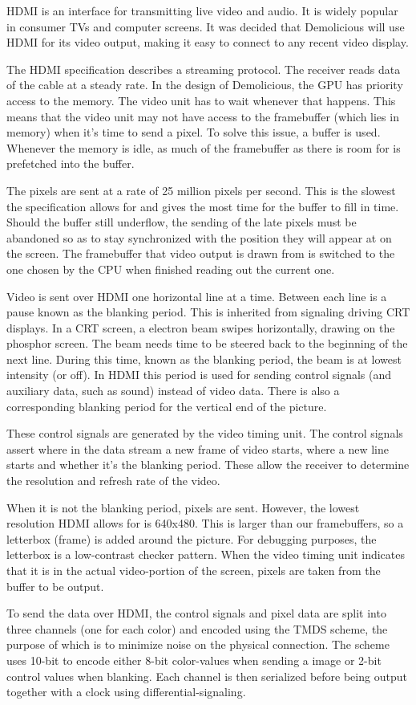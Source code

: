 \documentclass[../main/report.tex]{subfiles}
\begin{document}
HDMI is an interface for transmitting live video and audio.
It is widely popular in consumer TVs and computer screens.
It was decided that Demolicious will use HDMI for its video output, making it easy to connect to any recent video display.

The HDMI specification describes a streaming protocol.
The receiver reads data of the cable at a steady rate.
In the design of Demolicious, the GPU has priority access to the memory.
The video unit has to wait whenever that happens.
This means that the video unit may not have access to the framebuffer (which lies in memory) when it's time to send a pixel.
To solve this issue, a buffer is used.
Whenever the memory is idle, as much of the framebuffer as there is room for is prefetched into the buffer.

The pixels are sent at a rate of 25 million pixels per second.
This is the slowest the specification allows for and gives the most time for the buffer to fill in time.
Should the buffer still underflow, the sending of the late pixels must be abandoned so as to stay synchronized with the position they will appear at on the screen. The framebuffer that video output is drawn from is switched to the one chosen by the CPU when finished reading out the current one.

Video is sent over HDMI one horizontal line at a time.
Between each line is a pause known as the blanking period.
This is inherited from signaling driving CRT displays.
In a CRT screen, a electron beam swipes horizontally, drawing on the phosphor screen.
The beam needs time to be steered back to the beginning of the next line.
During this time, known as the blanking period, the beam is at lowest intensity (or off).
In HDMI this period is used for sending control signals (and auxiliary data, such as sound) instead of video data.
There is also a corresponding blanking period for the vertical end of the picture.

These control signals are generated by the video timing unit.
The control signals assert where in the data stream a new frame of video starts, where a new line starts and whether it's the blanking period.
These allow the receiver to determine the resolution and refresh rate of the video.

When it is not the blanking period, pixels are sent.
However, the lowest resolution HDMI allows for is 640x480.
This is larger than our framebuffers, so a letterbox (frame) is added around the picture.
For debugging purposes, the letterbox is a low-contrast checker pattern.
When the video timing unit indicates that it is in the actual video-portion of the screen, pixels are taken from the buffer to be output.

To send the data over HDMI, the control signals and pixel data are split into three channels (one for each color) and encoded using the TMDS scheme, the purpose of which is to minimize noise on the physical connection.
The scheme uses 10-bit to encode either 8-bit color-values when sending a image or 2-bit control values when blanking.
Each channel is then serialized before being output together with a clock using differential-signaling.
\end{document}
